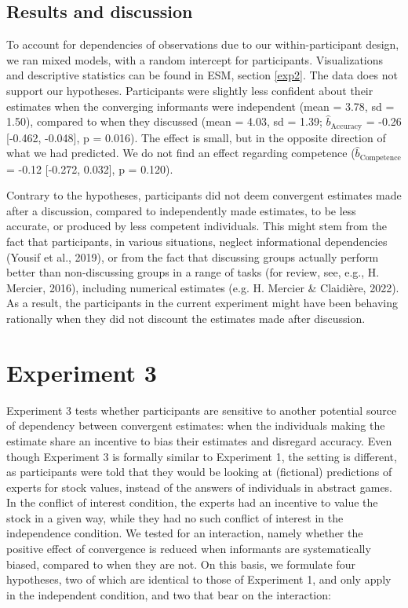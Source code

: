 \documentclass[
  doc,floatsintext]{apa6}
\begin{document}
\subsection{Results and discussion}\label{results-and-discussion-1}

To account for dependencies of observations due to our within-participant design, we ran mixed models, with a random intercept for participants. Visualizations and descriptive statistics can be found in ESM, section \ref{exp2}. The data does not support our hypotheses. Participants were slightly less confident about their estimates when the converging informants were independent (mean = 3.78, sd = 1.50), compared to when they discussed (mean = 4.03, sd = 1.39; \(\hat{b}_{\text{Accuracy}}\) = -0.26 {[}-0.462, -0.048{]}, p = 0.016). The effect is small, but in the opposite direction of what we had predicted. We do not find an effect regarding competence (\(\hat{b}_{\text{Competence}}\) = -0.12 {[}-0.272, 0.032{]}, p = 0.120).

Contrary to the hypotheses, participants did not deem convergent estimates made after a discussion, compared to independently made estimates, to be less accurate, or produced by less competent individuals. This might stem from the fact that participants, in various situations, neglect informational dependencies (Yousif et al., 2019), or from the fact that discussing groups actually perform better than non-discussing groups in a range of tasks (for review, see, e.g., H. Mercier, 2016), including numerical estimates (e.g. H. Mercier \& Claidière, 2022). As a result, the participants in the current experiment might have been behaving rationally when they did not discount the estimates made after discussion.

\section{Experiment 3}\label{experiment-3}

Experiment 3 tests whether participants are sensitive to another potential source of dependency between convergent estimates: when the individuals making the estimate share an incentive to bias their estimates and disregard accuracy. Even though Experiment 3 is formally similar to Experiment 1, the setting is different, as participants were told that they would be looking at (fictional) predictions of experts for stock values, instead of the answers of individuals in abstract games. In the conflict of interest condition, the experts had an incentive to value the stock in a given way, while they had no such conflict of interest in the independence condition. We tested for an interaction, namely whether the positive effect of convergence is reduced when informants are systematically biased, compared to when they are not. On this basis, we formulate four hypotheses, two of which are identical to those of Experiment 1, and only apply in the independent condition, and two that bear on the interaction:
\end{document}
